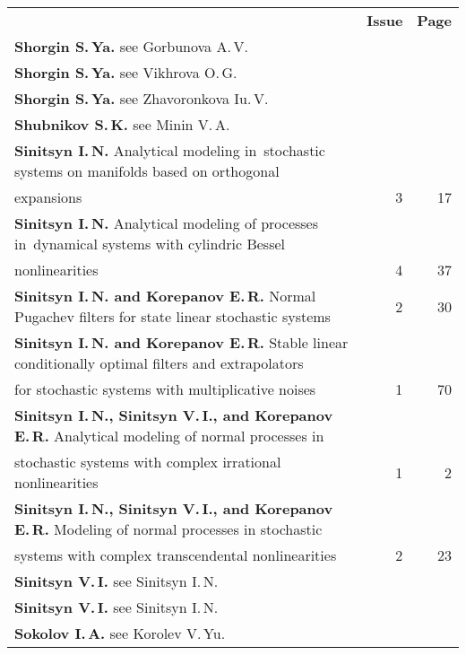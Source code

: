 {\tabcolsep=3pt
\begin{tabular}{p{397pt}rr}
&\textbf{Issue} & \textbf{Page}\\[6pt]
\textbf{Shorgin S.\,Ya.} see Gorbunova A.\,V.&&\\
\textbf{Shorgin S.\,Ya.} see Vikhrova O.\,G.&&\\
\textbf{Shorgin S.\,Ya.} see Zhavoronkova Iu.\,V.&&\\
\textbf{Shubnikov S.\,K.} see Minin V.\,A.&&\\
\textbf{Sinitsyn I.\,N.} Analytical modeling in~stochastic systems on manifolds
based on orthogonal\linebreak
\\[-12pt]
\hspace*{21pt}expansions&3&17\\
\textbf{Sinitsyn I.\,N.} Analytical modeling of processes in~dynamical systems with
cylindric Bessel\linebreak
\\[-12pt]
\hspace*{21pt}nonlinearities&4&37\\
\textbf{Sinitsyn I.\,N. and Korepanov E.\,R.} Normal Pugachev filters for
state linear stochastic systems&2&30\\
\textbf{Sinitsyn I.\,N. and Korepanov E.\,R.} Stable linear conditionally
optimal filters and extrapolators\linebreak
\\[-12pt]
\hspace*{21pt}for stochastic systems with multiplicative
noises&1&70\\
\textbf{Sinitsyn I.\,N., Sinitsyn V.\,I., and Korepanov E.\,R.} Analytical
modeling of normal processes in\linebreak
\\[-12pt]
\hspace*{21pt}stochastic systems with complex irrational
nonlinearities&1&2\\
\textbf{Sinitsyn I.\,N., Sinitsyn V.\,I., and Korepanov E.\,R.} Modeling of
normal processes in stochastic\linebreak
\\[-12pt]
\hspace*{21pt}systems with complex transcendental
nonlinearities&2&23\\
\textbf{Sinitsyn V.\,I.} see Sinitsyn I.\,N.&&\\
\textbf{Sinitsyn V.\,I.} see Sinitsyn I.\,N.&&\\
\textbf{Sokolov I.\,A.} see Korolev V.\,Yu.&&\\

\end{tabular}}
